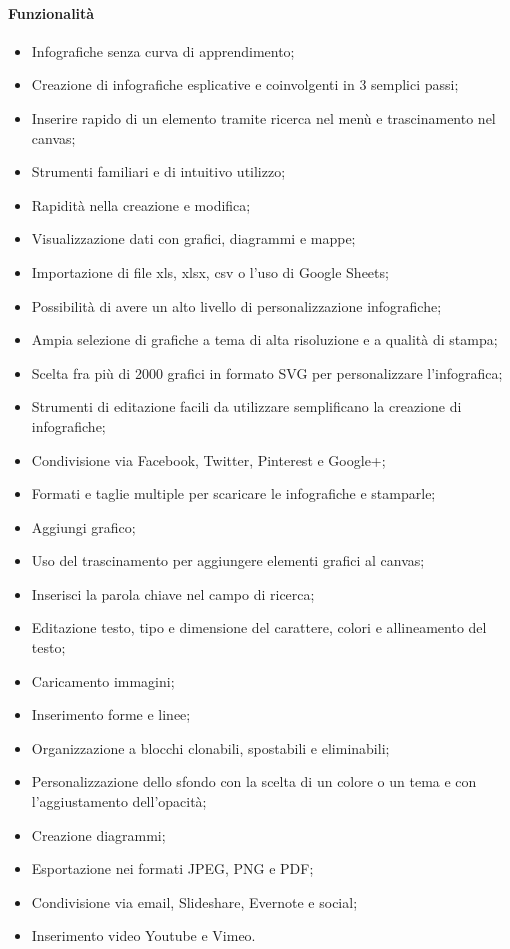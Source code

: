 \paragraph{Funzionalità}
\begin{itemize}
\item Infografiche senza curva di apprendimento;
\item Creazione di infografiche esplicative e coinvolgenti in 3 semplici passi;
\item Inserire rapido di un elemento tramite ricerca nel menù e trascinamento nel canvas;
\item Strumenti familiari e di intuitivo utilizzo;
\item Rapidità nella creazione e modifica;
\item Visualizzazione dati con grafici, diagrammi e mappe;
\item Importazione di file xls, xlsx, csv o l'uso di Google Sheets;
\item Possibilità di avere un alto livello di personalizzazione infografiche;
\item Ampia selezione di grafiche a tema di alta risoluzione e a qualità di stampa;
\item Scelta fra più di 2000 grafici in formato SVG per personalizzare l'infografica;
\item Strumenti di editazione facili da utilizzare semplificano la creazione di infografiche;
\item Condivisione via Facebook, Twitter, Pinterest e Google+;
\item Formati e taglie multiple per scaricare le infografiche e stamparle;
\item Aggiungi grafico;
\item Uso del trascinamento per aggiungere elementi grafici al canvas;
\item Inserisci la parola chiave nel campo di ricerca;
\item Editazione testo, tipo e dimensione del carattere, colori e allineamento del testo;
\item Caricamento immagini;
\item Inserimento forme e linee;
\item Organizzazione a blocchi clonabili, spostabili e eliminabili;
\item Personalizzazione dello sfondo con la scelta di un colore o un tema e con l'aggiustamento dell'opacità;
\item Creazione diagrammi;
\item Esportazione nei formati JPEG, PNG e PDF;
\item Condivisione via email, Slideshare, Evernote e social;
\item Inserimento video Youtube e Vimeo.
\end{itemize}

